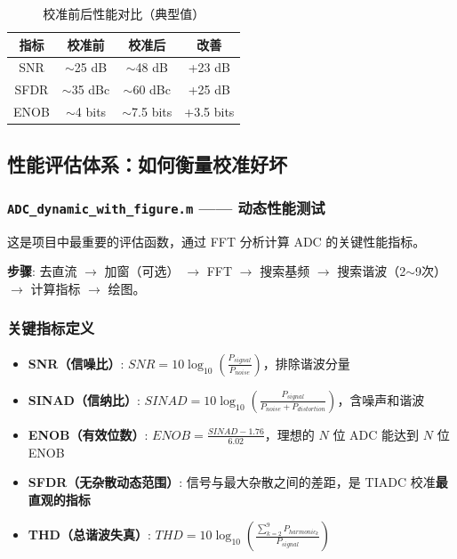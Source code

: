 \documentclass[UTF8,a4paper,11pt]{ctexart}
\begin{document}
\begin{table}[ht]
\centering
\caption{校准前后性能对比（典型值）}
\begin{tabular}{cccc}
\toprule
\textbf{指标} & \textbf{校准前} & \textbf{校准后} & \textbf{改善} \\
\midrule
SNR  & $\sim$25 dB & $\sim$48 dB & +23 dB \\
SFDR & $\sim$35 dBc & $\sim$60 dBc & +25 dB \\
ENOB & $\sim$4 bits & $\sim$7.5 bits & +3.5 bits \\
\bottomrule
\end{tabular}
\end{table}

\subsection{性能评估体系：如何衡量校准好坏}
\label{sec:metrics}

\subsubsection{\texttt{ADC\_dynamic\_with\_figure.m} —— 动态性能测试}

这是项目中最重要的评估函数，通过 FFT 分析计算 ADC 的关键性能指标。

\textbf{步骤}: 去直流 $\to$ 加窗（可选） $\to$ FFT $\to$ 搜索基频 $\to$ 搜索谐波（2$\sim$9次） $\to$ 计算指标 $\to$ 绘图。

\subsubsection{关键指标定义}

\begin{itemize}
    \item \textbf{SNR（信噪比）}: $\displaystyle SNR = 10 \log_{10} \left(\frac{P_{signal}}{P_{noise}}\right)$，排除谐波分量
    \item \textbf{SINAD（信纳比）}: $\displaystyle SINAD = 10 \log_{10} \left(\frac{P_{signal}}{P_{noise} + P_{distortion}}\right)$，含噪声和谐波
    \item \textbf{ENOB（有效位数）}: $\displaystyle ENOB = \frac{SINAD - 1.76}{6.02}$，理想的 $N$ 位 ADC 能达到 $N$ 位 ENOB
    \item \textbf{SFDR（无杂散动态范围）}: 信号与最大杂散之间的差距，是 TIADC 校准\textbf{最直观的指标}
    \item \textbf{THD（总谐波失真）}: $\displaystyle THD = 10 \log_{10} \left(\frac{\sum_{k=2}^{9} P_{harmonic_k}}{P_{signal}}\right)$
\end{itemize}
\end{document}
